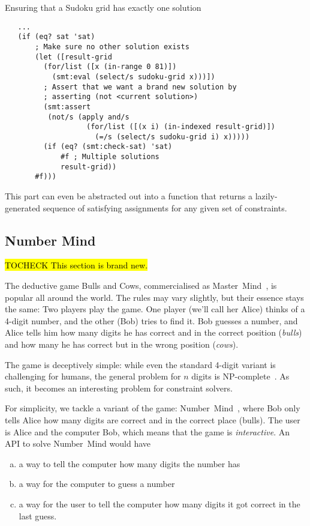 \begin{program}
\caption{Ensuring that a Sudoku grid has exactly one solution}
\label{fig:sudoku-unique}
\begin{verbatim}
   ...
   (if (eq? sat 'sat)
       ; Make sure no other solution exists
       (let ([result-grid
         (for/list ([x (in-range 0 81)])
           (smt:eval (select/s sudoku-grid x)))])
         ; Assert that we want a brand new solution by
         ; asserting (not <current solution>)
         (smt:assert
          (not/s (apply and/s
                   (for/list ([(x i) (in-indexed result-grid)])
                     (=/s (select/s sudoku-grid i) x)))))
         (if (eq? (smt:check-sat) 'sat)
             #f ; Multiple solutions
             result-grid))
       #f)))
\end{verbatim}
\end{program}

This part can even be abstracted out into a function that returns a
lazily-generated sequence of satisfying assignments for any given set of
constraints.

\subsection{Number Mind}

\hl{TOCHECK This section is brand new.}

The deductive game Bulls and Cows, commercialised as
Master~Mind~\cite{mastermind}, is popular all around the world. The rules may
vary slightly, but their essence stays the same: Two players play the game.
One player (we'll call her Alice) thinks of a 4-digit number, and the other
(Bob) tries to find it. Bob guesses a number, and Alice tells him how many
digits he has correct and in the correct position (\textit{bulls}) and how
many he has correct but in the wrong position (\textit{cows}).

The game is deceptively simple: while even the standard 4-digit variant is
challenging for humans, the general problem for $n$ digits is
NP-complete~\cite{mastermindnpc}. As such, it becomes an interesting problem for
constraint solvers.

For simplicity, we tackle a variant of the game:
Number~Mind~\cite{numbermind}, where Bob only tells Alice how many digits are
correct and in the correct place (bulls). The user is Alice and the computer
Bob, which means that the game is \textit{interactive}. An API to solve
Number~Mind would have

\begin{enumerate}[(a)]
\item a way to tell the computer how many digits the number has
\item a way for the computer to guess a number
\item a way for the user to tell the computer how many digits it got correct
  in the last guess.
\end{enumerate}

